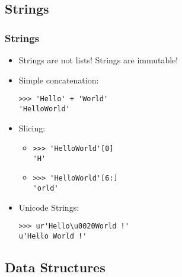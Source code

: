 \documentclass{beamer}
\begin{document}
\subsection{Strings}
\begin{frame}[fragile]
    \frametitle{Strings}
    \begin{itemize}
        \item<1-> Strings are not lists! Strings are immutable!
        \item<2-> Simple concatenation: 
            \begin{verbatim}
>>> 'Hello' + 'World'
'HelloWorld'
            \end{verbatim}
        \item<3-> Slicing:
            \begin{itemize}
                \item<4->\begin{verbatim}
>>> 'HelloWorld'[0]
'H'
                    \end{verbatim}

                \item<5->\begin{verbatim}
>>> 'HelloWorld'[6:]
'orld'
                    \end{verbatim}

            \end{itemize}
        \item<6-> Unicode Strings:

            \begin{verbatim}
>>> ur'Hello\u0020World !'
u'Hello World !'
            \end{verbatim}

    \end{itemize}
\end{frame}

\subsection{Data Structures}
\end{document}
